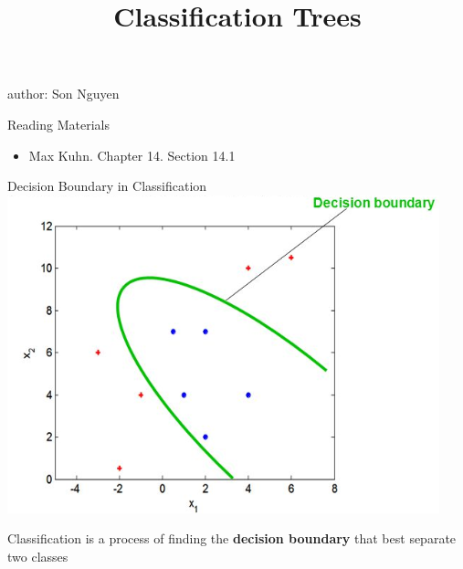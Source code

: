 \documentclass[
  ignorenonframetext,
]{beamer}
\title{Classification Trees}
\author{}
\date{\vspace{-2.5em}}
\providecommand{\tightlist}{%
  \setlength{\itemsep}{0pt}\setlength{\parskip}{0pt}}
\begin{document}
\frame{\titlepage}

\begin{frame}
author: Son Nguyen
\end{frame}

\begin{frame}{Reading Materials}
\protect\hypertarget{reading-materials}{}
\begin{itemize}
\tightlist
\item
  Max Kuhn. Chapter 14. Section 14.1
\end{itemize}
\end{frame}

\begin{frame}{Decision Boundary in Classification}
\protect\hypertarget{decision-boundary-in-classification}{}
\includegraphics{images/db.png}

Classification is a process of finding the \textbf{decision boundary}
that best separate two classes
\end{frame}
\end{document}
